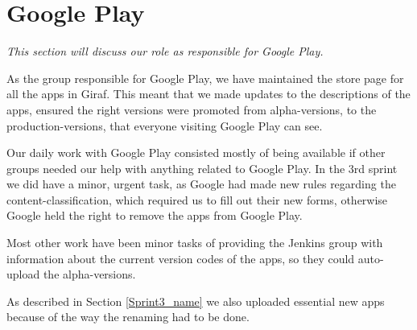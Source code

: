 \section{Google Play} \label{Roles_SecGooglePlay}
\textit{This section will discuss our role as responsible for Google Play.}

As the group responsible for Google Play, we have maintained the store page for all the apps in Giraf. This meant that we made updates to the descriptions of the apps, ensured the right versions were promoted from alpha-versions, to the production-versions, that everyone visiting Google Play can see.

Our daily work with Google Play consisted mostly of being available if other groups needed our help with anything related to Google Play. In the 3rd sprint we did have a minor, urgent task, as Google had made new rules regarding the content-classification, which required us to fill out their new forms, otherwise Google held the right to remove the apps from Google Play.

Most other work have been minor tasks of providing the Jenkins group with information about the current version codes of the apps, so they could auto-upload the alpha-versions.

As described in Section \ref{Sprint3_name} we also uploaded essential new apps because of the way the renaming had to be done.

